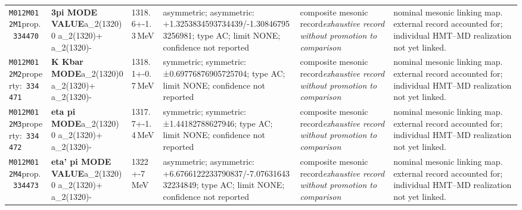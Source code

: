 \begin{landscape}
\begin{longtable}{L{1.85cm}L{4.45cm}L{2.35cm}L{4.05cm}L{3.35cm}L{7.15cm}}
\texttt{M012}\newline \texttt{M012M1}\newline prop.\ \texttt{334470} & \textbf{3pi MODE VALUE}\newline a\_\allowbreak{}2(1320)0 \textbar{}\allowbreak{} a\_\allowbreak{}2(1320)+ \textbar{}\allowbreak{} a\_\allowbreak{}2(1320)- & 1318.6+-1.3\,MeV & asymmetric; asymmetric: +1.3253834593734439/-1.308467953256981; type AC; limit NONE; confidence not reported & composite mesonic record\newline \emph{exhaustive record without promotion to comparison} & nominal mesonic linking map. external record accounted for; individual HMT--MD realization not yet linked. \\
\texttt{M012}\newline \texttt{M012M2}\newline property:\ \texttt{334471} & \textbf{K Kbar MODE}\newline a\_\allowbreak{}2(1320)0 \textbar{}\allowbreak{} a\_\allowbreak{}2(1320)+ \textbar{}\allowbreak{} a\_\allowbreak{}2(1320)- & 1318.1+-0.7\,MeV & symmetric; symmetric: ±0.69776876905725704; type AC; limit NONE; confidence not reported & composite mesonic record\newline \emph{exhaustive record without promotion to comparison} & nominal mesonic linking map. external record accounted for; individual HMT--MD realization not yet linked. \\
\texttt{M012}\newline \texttt{M012M3}\newline property:\ \texttt{334472} & \textbf{eta pi MODE}\newline a\_\allowbreak{}2(1320) 0 \textbar{}\allowbreak{} a\_\allowbreak{}2(1320)+ \textbar{}\allowbreak{} a\_\allowbreak{}2(1320)- & 1317.7+-1.4\,MeV & symmetric; symmetric: ±1.44182788627946; type AC; limit NONE; confidence not reported & composite mesonic record\newline \emph{exhaustive record without promotion to comparison} & nominal mesonic linking map. external record accounted for; individual HMT--MD realization not yet linked. \\
\texttt{M012}\newline \texttt{M012M4}\newline prop.\ \texttt{334473} & \textbf{eta' pi MODE VALUE}\newline a\_\allowbreak{}2(1320)0 \textbar{}\allowbreak{} a\_\allowbreak{}2(1320)+ \textbar{}\allowbreak{} a\_\allowbreak{}2(1320)- & 1322+-7\,MeV & asymmetric; asymmetric: +6.6766122233790837/-7.0763164332234849; type AC; limit NONE; confidence not reported & composite mesonic record\newline \emph{exhaustive record without promotion to comparison} & nominal mesonic linking map. external record accounted for; individual HMT--MD realization not yet linked. \\

\end{longtable}
\end{landscape}
